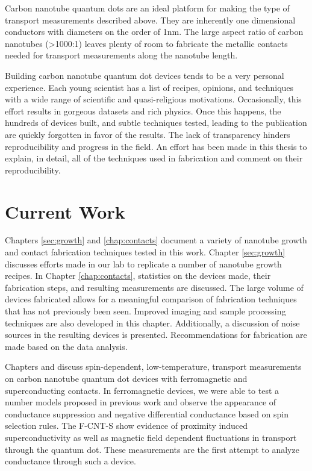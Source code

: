 Carbon nanotube quantum dots are an ideal platform for making the type of transport measurements described above. They are inherently one dimensional conductors with diameters on the order of 1nm. The large aspect ratio of carbon nanotubes (>1000:1) leaves plenty of room to fabricate the metallic contacts needed for transport measurements along the nanotube length.

Building carbon nanotube quantum dot devices tends to be a very personal experience. Each young scientist has a list of recipes, opinions, and techniques with a wide range of scientific and quasi-religious motivations. Occasionally, this effort results in gorgeous datasets and rich physics. Once this happens, the hundreds of devices built, and subtle techniques tested, leading to the publication are quickly forgotten in favor of the results. The lack of transparency hinders reproducibility and progress in the field. An effort has been made in this thesis to explain, in detail, all of the techniques used in fabrication and comment on their reproducibility.

\section{Current Work}

Chapters \ref{sec:growth} and \ref{chap:contacts} document a variety of nanotube growth and contact fabrication techniques tested in this work. Chapter \ref{sec:growth} discusses  efforts made in our lab to replicate a number of nanotube growth recipes. In Chapter \ref{chap:contacts}, statistics on the devices made, their fabrication steps, and resulting measurements are discussed. The large volume of devices fabricated allows for a meaningful comparison of fabrication techniques that has not previously been seen. Improved imaging and sample processing techniques are also developed in this chapter. Additionally, a discussion of noise sources in the resulting devices is presented. Recommendations for fabrication are made based on the data analysis.

Chapters \label{sec:FMCNTQD} and \label{sec:SCFM} discuss spin-dependent, low-temperature, transport measurements on carbon nanotube quantum dot devices with ferromagnetic and superconducting contacts. In ferromagnetic devices, we were able to test a number models proposed in previous work and observe the appearance of conductance suppression and negative differential conductance based on spin selection rules. The F-CNT-S show evidence of proximity induced superconductivity as well as magnetic field dependent fluctuations in transport through the quantum dot. These measurements are the first attempt to analyze conductance through such a device.

